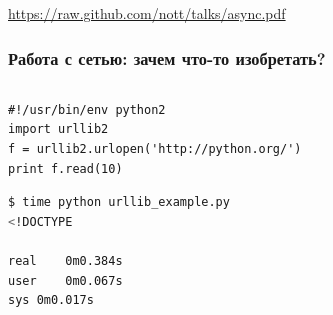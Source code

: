 \documentclass[aspectratio=169]{beamer}
\begin{document}
\begin{frame}
  \vspace{1cm}
  \begin{center}
    \url{https://raw.github.com/nott/talks/async.pdf}
  \end{center}
\end{frame}


\begin{frame}[fragile]
  \frametitle{Работа с сетью: зачем что-то изобретать?}

  \begin{columns}
    \begin{column}{.8\textwidth}
      
      \begin{lstlisting}[caption=urllib\_example.py]
#!/usr/bin/env python2
import urllib2
f = urllib2.urlopen('http://python.org/')
print f.read(10)
      \end{lstlisting}

      \pause

      \begin{lstlisting}[language=sh]
$ time python urllib_example.py 
<!DOCTYPE 

real	0m0.384s
user	0m0.067s
sys	0m0.017s
      \end{lstlisting}

    \end{column}
    \hfill
    \pause


\end{columns}
\end{frame}
\end{document}
